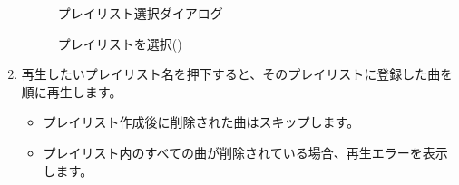 \begin{enumerate}
\begin{figure}[htbp]
\begin{minipage}[b]{0.45\linewidth}
{                        }
                        \caption{プレイリスト選択ダイアログ}
                        \label{img:playlist9}
                    \end{minipage}
                    \caption*{プレイリストを選択(\currentVersion)}
                \end{figure}

            \newpage
            \item 再生したいプレイリスト名を押下すると、そのプレイリストに登録した曲を順に再生します。
                \begin{itemize}
                    \item プレイリスト作成後に削除された曲はスキップします。
                    \item プレイリスト内のすべての曲が削除されている場合、再生エラーを表示します。
                \end{itemize}
        \end{enumerate}
